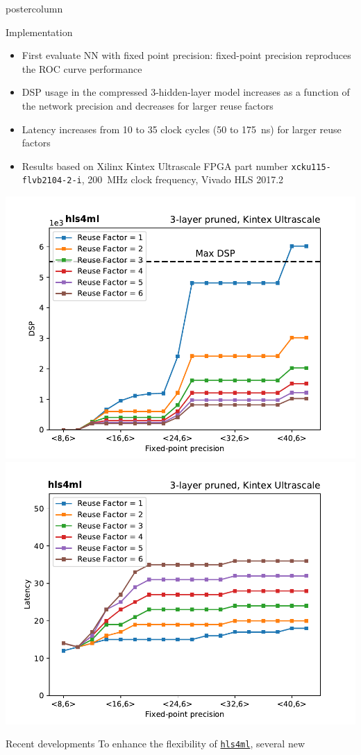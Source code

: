 \documentclass[final,hyperref={pdfpagelabels=false}]{beamer}
\newcommand{\hlsfml}{{\href{https://github.com/hls-fpga-machine-learning/hls4ml}{\texttt{hls4ml}}}}
\begin{document}
\begin{frame}
\begin{columns}
\begin{column}{.49\textwidth}
\begin{beamercolorbox}[center,wd=\textwidth]{postercolumn}
\begin{minipage}[T]{.95\textwidth}
{            \begin{block}{Implementation}
              \begin{itemize}
                \item First evaluate NN with fixed point precision:
                  {\tt <16,6>} fixed-point precision reproduces the
                  ROC curve performance
                \item DSP usage in the compressed 3-hidden-layer model
                  increases as a function of the network precision and
                  decreases for larger reuse factors
                  \item Latency increases from 10 to 35 clock cycles
                    (50 to 175~ns) for larger reuse factors
                  \item Results based on Xilinx Kintex Ultrascale FPGA part number
                    \texttt{xcku115-flvb2104-2-i}, 200~MHz clock
                    frequency, Vivado HLS 2017.2
              \end{itemize}
              \begin{center}
                \includegraphics[width=0.49\linewidth]{scan_X_6_KUS_DSP_pruned.pdf}
                \includegraphics[width=0.49\linewidth]{scan_X_6_KUS_Latency_pruned.pdf}
              \end{center}
            \end{block}
                  \begin{block}{Recent developments}
                    To enhance the flexibility of \hlsfml, several new

\end{block}}
\end{minipage}
\end{beamercolorbox}
\end{column}
\end{columns}
\end{frame}
\end{document}
